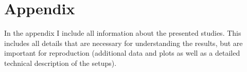 \chapter{Appendix}\label{chap:appendix}
\begin{chapter-abstract}
In the appendix I include all information about the presented studies.
This includes all details that are necessary for understanding the results, but are important for reproduction (additional data and plots as well as a detailed technical description of the setups).
\end{chapter-abstract}